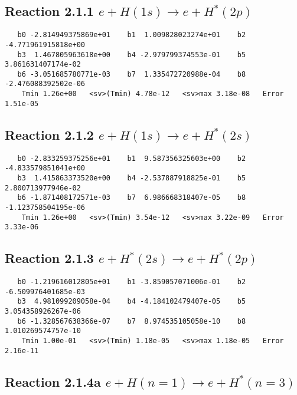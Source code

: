 \documentclass[12pt]{article}
\begin{document}
\subsection{
Reaction 2.1.1 $   e + H(1s) \rightarrow e + H^*(2p)$}


\begin{small}\begin{verbatim}
   b0 -2.814949375869e+01    b1  1.009828023274e+01    b2 -4.771961915818e+00
   b3  1.467805963618e+00    b4 -2.979799374553e-01    b5  3.861631407174e-02
   b6 -3.051685780771e-03    b7  1.335472720988e-04    b8 -2.476088392502e-06
    Tmin 1.26e+00   <sv>(Tmin) 4.78e-12   <sv>max 3.18e-08   Error 1.51e-05
\end{verbatim}\end{small}

\newpage
\subsection{
Reaction 2.1.2 $   e + H(1s) \rightarrow e + H^*(2s)$}


\begin{small}\begin{verbatim}
   b0 -2.833259375256e+01    b1  9.587356325603e+00    b2 -4.833579851041e+00
   b3  1.415863373520e+00    b4 -2.537887918825e-01    b5  2.800713977946e-02
   b6 -1.871408172571e-03    b7  6.986668318407e-05    b8 -1.123758504195e-06
    Tmin 1.26e+00   <sv>(Tmin) 3.54e-12   <sv>max 3.22e-09   Error 3.33e-06
\end{verbatim}\end{small}

\newpage
\subsection{
Reaction 2.1.3 $   e + H^*(2s) \rightarrow e + H^*(2p)$}


\begin{small}\begin{verbatim}
   b0 -1.219616012805e+01    b1 -3.859057071006e-01    b2 -6.509976401685e-03
   b3  4.981099209058e-04    b4 -4.184102479407e-05    b5  3.054358926267e-06
   b6 -1.328567638366e-07    b7  8.974535105058e-10    b8  1.010269574757e-10
    Tmin 1.00e-01   <sv>(Tmin) 1.18e-05   <sv>max 1.18e-05   Error 2.16e-11
\end{verbatim}\end{small}

\newpage
\subsection{
Reaction 2.1.4a $   e + H(n=1) \rightarrow e + H^*(n=3)$}
\end{document}
